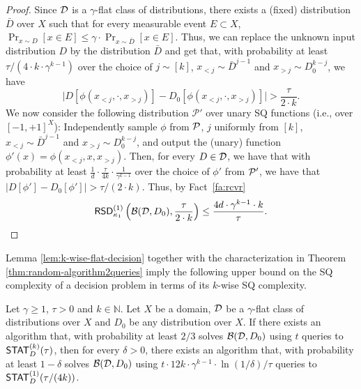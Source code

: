 \begin{proof}
Since $\mathcal{D}$ is a $\gamma$-flat class of distributions, there exists a (fixed) distribution $\bar{D}$ over $X$ such that for every measurable event $E \subset X$, $\Pr_{x\sim D}[x \in E] \le \gamma \cdot \Pr_{x\sim \bar{D}}[x \in E]$. Thus, we can replace the unknown input distribution $D$ by the distribution $\bar{D}$ and get that, with probability at least $\tau/(4 \cdot k \cdot \gamma^{k-1})$ over the choice of $j\sim [k]$, $x_{< j} \sim \bar{D}^{j-1}$ and $x_{> j} \sim D_0^{k-j}$, we have
\begin{equation}\label{eq:after_flat}
\bigg|D[\phi(x_{<j}, \cdot, x_{> j})] - D_0[\phi(x_{<j}, \cdot, x_{> j})]\bigg| > \frac{\tau}{2 \cdot k}.
\end{equation}
We now consider the following distribution $\mathcal{P'}$ over unary SQ functions (i.e., over $[-1,+1]^X$): Independently sample $\phi$ from $\mathcal{P}$, $j$ uniformly from $[k]$, $x_{< j} \sim \bar{D}^{j-1}$ and $x_{> j} \sim D_0^{k-j}$, and output the (unary) function $\phi'(x) = \phi(x_{<j}, x, x_{> j})$. Then, for every $D\in \mathcal{D}$, we have that with probability at least $\frac{1}{d }\cdot \frac{\tau}{4k} \cdot \frac{1}{\gamma^{k-1}}$ over the choice of $\phi'$ from $\mathcal{P}'$, we have that $|D[\phi'] - D_0[\phi']| > \tau/(2 \cdot k)$. Thus, by Fact~\ref{fa:rcvr} $$\mathsf{RSD}_{\kappa_1}^{(1)}\left(\mathcal{B}(\mathcal{D},D_0),\frac{\tau}{2 \cdot k}\right) \le \frac{4 d \cdot \gamma^{k-1} \cdot k}{\tau}.$$
\end{proof}

Lemma \ref{lem:k-wise-flat-decision} together with the characterization in Theorem \ref{thm:random-algorithm2queries} imply the following upper bound on the SQ complexity of a decision problem in terms of its $k$-wise SQ complexity.
\begin{theorem}\label{thm:flat-decision-reduction}
Let $\gamma \geq 1$, $\tau > 0$ and $k \in \mathbb{N}$. Let $X$ be a domain, $\mathcal{D}$ be a $\gamma$-flat class of distributions over $X$ and $D_0$ be any distribution over $X$. If there exists an algorithm that, with probability at least $2/3$ solves $\mathcal{B}(\mathcal{D},D_0)$ using $t$ queries to $\mathsf{STAT}^{(k)}_D(\tau)$, then for every $\delta>0$, there exists an algorithm that, with probability at least $1-\delta$ solves $\mathcal{B}(\mathcal{D},D_0)$ using $t \cdot 12k \cdot \gamma^{k-1} \cdot \ln(1/\delta) /\tau$ queries to $\mathsf{STAT}^{(1)}_D(\tau/(4k))$.
\end{theorem}

